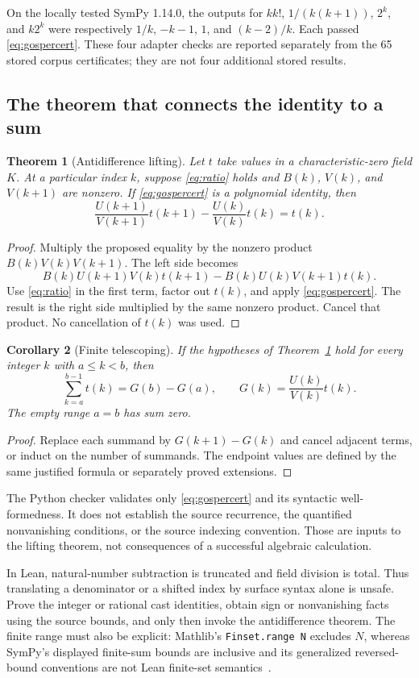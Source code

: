 \documentclass[11pt,letterpaper]{article}
\newcommand{\code}[1]{\texttt{#1}}
\newtheorem{theorem}{Theorem}[section]
\newtheorem{corollary}[theorem]{Corollary}
\theoremstyle{definition}\newtheorem{definition}[theorem]{Definition}
\theoremstyle{remark}\newtheorem{remark}[theorem]{Remark}
\begin{document}
On the locally tested SymPy 1.14.0, the outputs for
$k k!$, $1/(k(k+1))$, $2^k$, and $k2^k$ were respectively
$1/k$, $-k-1$, $1$, and $(k-2)/k$. Each passed
\eqref{eq:gospercert}. These four adapter checks are reported separately from
the 65 stored corpus certificates; they are not four additional stored results.

\subsection{The theorem that connects the identity to a sum}
\begin{theorem}[Antidifference lifting]
\label{thm:antidifference}
Let $t$ take values in a characteristic-zero field $K$. At a particular index
$k$, suppose \eqref{eq:ratio} holds and $B(k)$, $V(k)$, and $V(k+1)$ are
nonzero. If \eqref{eq:gospercert} is a polynomial identity, then
\[
 \frac{U(k+1)}{V(k+1)}t(k+1)
 -\frac{U(k)}{V(k)}t(k)=t(k).
\]
\end{theorem}
\begin{proof}
Multiply the proposed equality by the nonzero product
$B(k)V(k)V(k+1)$. The left side becomes
\[
 B(k)U(k+1)V(k)t(k+1)-B(k)U(k)V(k+1)t(k).
\]
Use \eqref{eq:ratio} in the first term, factor out $t(k)$, and apply
\eqref{eq:gospercert}. The result is the right side multiplied by the same
nonzero product. Cancel that product. No cancellation of $t(k)$ was used.
\end{proof}

\begin{corollary}[Finite telescoping]
If the hypotheses of Theorem~\ref{thm:antidifference} hold for every integer
$k$ with $a\le k<b$, then
\[
 \sum_{k=a}^{b-1}t(k)=G(b)-G(a),\qquad
 G(k)=\frac{U(k)}{V(k)}t(k).
\]
The empty range $a=b$ has sum zero.
\end{corollary}
\begin{proof}
Replace each summand by $G(k+1)-G(k)$ and cancel adjacent terms, or induct on
the number of summands. The endpoint values are defined by the same justified
formula or separately proved extensions.
\end{proof}

The Python checker validates only \eqref{eq:gospercert} and its syntactic
well-formedness. It does not establish the source recurrence, the quantified
nonvanishing conditions, or the source indexing convention. Those are inputs
to the lifting theorem, not consequences of a successful algebraic calculation.

In Lean, natural-number subtraction is truncated and field division is total.
Thus translating a denominator or a shifted index by surface syntax alone is
unsafe. Prove the integer or rational cast identities, obtain sign or
nonvanishing facts using the source bounds, and only then invoke the
antidifference theorem. The finite range must also be explicit: Mathlib's
\code{Finset.range N} excludes $N$, whereas SymPy's displayed finite-sum bounds
are inclusive and its generalized reversed-bound conventions are not Lean
finite-set semantics~\cite{finset-range,sympy-concrete}.
\end{document}

